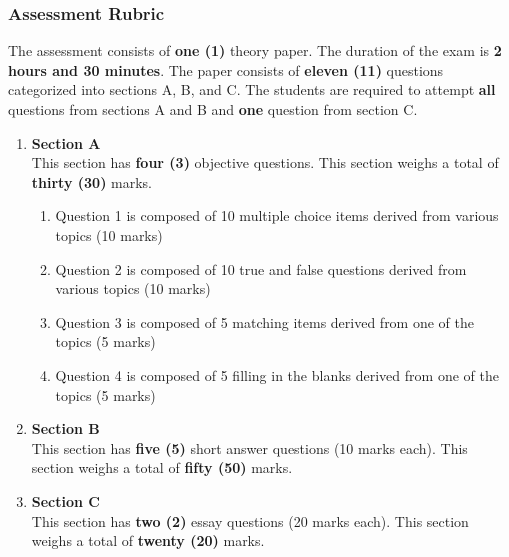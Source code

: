 \subsubsection{Assessment Rubric}
\noindent The assessment consists of \textbf{one (1)} theory paper. The duration of the exam is \textbf{2 hours and 30 minutes}. The paper consists of \textbf{eleven (11)} questions categorized into sections A, B, and C. The students are required to attempt \textbf{all} questions from sections A and B and \textbf{one} question from section C. 
\begin{enumerate}
	\item \textbf{Section A} \\
	This section has \textbf{four (3)} objective questions. This section weighs a total of \textbf{thirty (30)} marks.
	\begin{enumerate}
		\item Question 1 is composed of 10 multiple choice items derived from various topics (10 marks)
		\item Question 2 is composed of 10 true and false questions derived from various topics (10 marks)
		\item Question 3 is composed of 5 matching items derived from one of the topics (5 marks)
		\item Question 4 is composed of 5 filling in the blanks derived from one of the topics (5 marks)
	\end{enumerate}
	
	\item \textbf{Section B} \\
	This section has \textbf{five (5)} short answer questions (10 marks each). This section weighs a total of \textbf{fifty (50)} marks.
	
	\item \textbf{Section C} \\
	This section has \textbf{two (2)} essay questions (20 marks each). This section weighs a total of \textbf{twenty (20)} marks. 
\end{enumerate}

